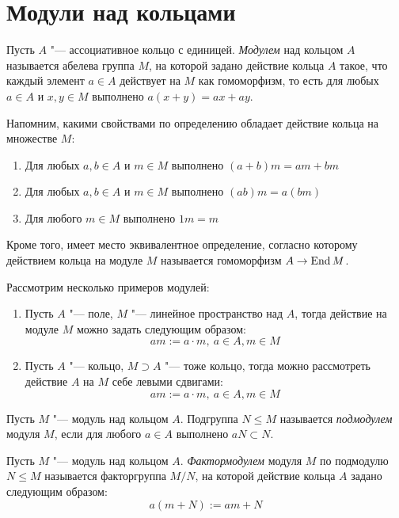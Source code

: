 \section{Модули над кольцами}

\begin{definition}
	Пусть $A$ "--- ассоциативное кольцо с единицей. \textit{Модулем} над кольцом $A$ называется абелева группа $M$, на которой задано действие кольца $A$ такое, что каждый элемент $a \in A$ действует на $M$ как гомоморфизм, то есть для любых $a \in A$ и $x, y \in M$ выполнено $a(x + y) = ax + ay$.
\end{definition}

\begin{note}
	Напомним, какими свойствами по определению обладает действие кольца на множестве $M$:
	\begin{enumerate}
		\item Для любых $a, b \in A$ и $m \in M$ выполнено $(a + b)m = am + bm$
		\item Для любых $a, b \in A$ и $m \in M$ выполнено $(ab)m = a(bm)$
		\item Для любого $m \in M$ выполнено $1m = m$
	\end{enumerate}
	
	Кроме того, имеет место эквивалентное определение, согласно которому действием кольца на модуле $M$ называется гомоморфизм $A \to \operatorname{End}{M}$.
\end{note}

\begin{example}
	Рассмотрим несколько примеров модулей:
	\begin{enumerate}
		\item Пусть $A$ "--- поле, $M$ "--- линейное пространство над $A$, тогда действие на модуле $M$ можно задать следующим образом:
		\[am := a\cdot m,~a \in A, m \in M\]
		\item Пусть $A$ "--- кольцо, $M \supset A$ "--- тоже кольцо, тогда можно рассмотреть действие $A$ на $M$ себе левыми сдвигами:
		\[am := a\cdot m,~a\in A, m \in M\]
	\end{enumerate}
\end{example}

\begin{definition}
	Пусть $M$ "--- модуль над кольцом $A$. Подгруппа $N \le M$ называется \textit{подмодулем} модуля $M$, если для любого $a \in A$ выполнено $aN \subset N$.
\end{definition}

\begin{definition}
	Пусть $M$ "--- модуль над кольцом $A$. \textit{Фактормодулем} модуля $M$ по подмодулю $N \le M$ называется факторгруппа $M / N$, на которой действие кольца $A$ задано следующим образом:
	\[a(m + N) := am + N\]
\end{definition}

